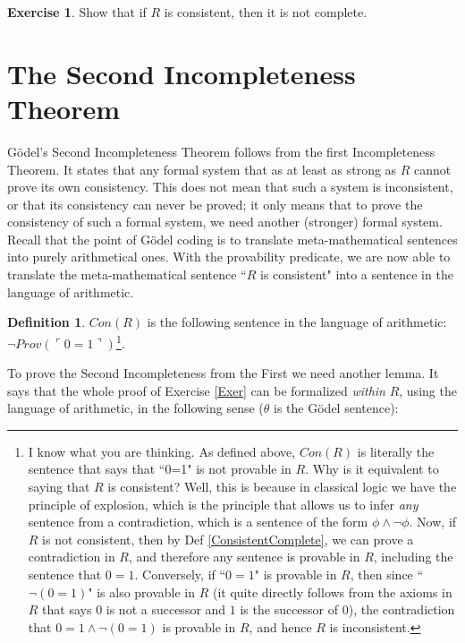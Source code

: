 \documentclass[11pt]{article}
\theoremstyle{definition}
\newtheorem{defn}{Definition}
\newtheorem{exer}{Exercise}
\begin{document}
\begin{exer}
Show that if $R$ is consistent, then it is not complete.
\end{exer}

\section{The Second Incompleteness Theorem}

G\"odel's Second Incompleteness Theorem follows from the first Incompleteness Theorem. It states that any formal system that as at least as strong as $R$ cannot prove its own consistency. This does not mean that such a system is inconsistent, or that its consistency can never be proved; it only means that to prove the consistency of such a formal system, we need another (stronger) formal system. \\

Recall that the point of G\"odel coding is to translate meta-mathematical sentences into purely arithmetical ones. With the provability predicate, we are now able to translate the meta-mathematical sentence ``$R$ is consistent" into a sentence in the language of arithmetic.

\begin{defn}
$Con(R)$ is the following sentence in the language of arithmetic: $\neg Prov(\ulcorner 0 = 1 \urcorner)$\footnote{I know what you are thinking. As defined above, $Con(R)$ is literally the sentence that says that ``0=1" is not provable in $R$. Why is it equivalent to saying that $R$ is consistent? Well, this is because in classical logic we have the principle of explosion, which is the principle that allows us to infer \textit{any} sentence from a contradiction, which is a sentence of the form $\phi \land \neg \phi$. Now, if $R$ is not consistent, then by Def \ref{ConsistentComplete}, we can prove a contradiction in $R$, and therefore any sentence is provable in $R$, including the sentence that $0=1$. Conversely, if ``$0=1$" is provable in $R$, then since ``$\neg (0 = 1)$" is also provable in $R$ (it quite directly follows from the axioms in $R$ that says $0$ is not a successor and $1$ is the successor of $0$), the contradiction that $0=1 \land \neg (0 = 1)$ is provable in $R$, and hence $R$ is inconsistent.}.

\end{defn}

To prove the Second Incompleteness from the First we need another lemma. It says that the whole proof of Exercise \ref{Exer} can be formalized \textit{within} $R$, using the language of arithmetic, in the following sense ($\theta$ is the G\"odel sentence):
\end{document}
